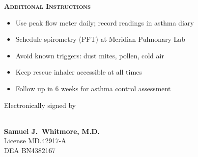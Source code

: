 \documentclass[12pt,letterpaper]{article}
\newcommand{\rxsection}[1]{%
  \vspace{2pt}%
  {\footnotesize\color{rxaccent}\textbf{\textsc{#1}}}\\[3pt]%
}
\begin{document}
\vspace{8pt}

\begin{minipage}[t]{0.58\linewidth}
\begin{tcolorbox}[colback=rxlight!20,colframe=rxblue,sharp corners,boxrule=1.2pt,left=14pt,right=14pt,top=12pt,bottom=12pt]
  \rxsection{Additional Instructions}
  \begin{itemize}[leftmargin=*,nosep,itemsep=3pt]
    \item[\color{rxaccent}\faCheckSquare] Use peak flow meter daily; record readings in asthma diary
    \item[\color{rxaccent}\faCheckSquare] Schedule spirometry (PFT) at Meridian Pulmonary Lab
    \item[\color{rxaccent}\faCheckSquare] Avoid known triggers: dust mites, pollen, cold air
    \item[\color{rxaccent}\faCheckSquare] Keep rescue inhaler accessible at all times
    \item[\color{rxaccent}\faCheckSquare] Follow up in 6 weeks for asthma control assessment
  \end{itemize}
\end{tcolorbox}
\end{minipage}
\hfill
\begin{minipage}[t]{0.38\linewidth}
\begin{tcolorbox}[colback=white,colframe=rxblue,sharp corners,boxrule=1.2pt,left=14pt,right=14pt,top=12pt,bottom=12pt]
  \centering
  \vspace{6pt}
  {\small\color{rxgray}Electronically signed by}\\[4pt]
  \\[2pt]
  {\small\color{rxblue}\textbf{Samuel J.\ Whitmore, M.D.}}\\[2pt]
  {\footnotesize\color{rxgray}License MD.42917-A}\\[2pt]
  {\footnotesize\color{rxgray}DEA BN4382167}\\[6pt]
  \vspace{6pt}
\end{tcolorbox}
\end{minipage}
\end{document}
